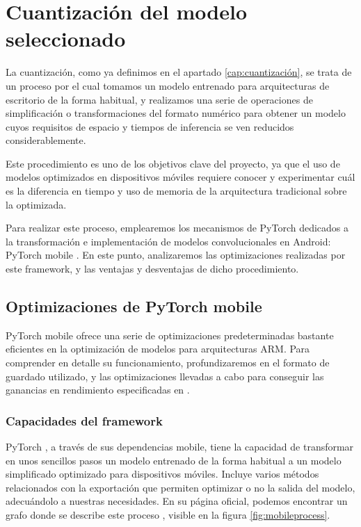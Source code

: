 \chapter{Cuantización del modelo seleccionado}
\label{sec:capt6}

La cuantización, como ya definimos en el apartado \ref{cap:cuantización}, se trata de un proceso por el cual tomamos un modelo entrenado para arquitecturas de escritorio de la forma habitual, y realizamos una serie de operaciones de simplificación o transformaciones del formato numérico para obtener un modelo cuyos requisitos de espacio y tiempos de inferencia se ven reducidos considerablemente. 

Este procedimiento es uno de los objetivos clave del proyecto, ya que el uso de modelos optimizados en dispositivos móviles requiere conocer y experimentar cuál es la diferencia en tiempo y uso de memoria de la arquitectura tradicional sobre la optimizada.

Para realizar este proceso, emplearemos los mecanismos de PyTorch\cite{paszke2019pytorch} dedicados a la transformación e implementación de modelos convolucionales en Android: PyTorch mobile  \cite{pmobile}. En este punto, analizaremos las optimizaciones realizadas por este framework, y las ventajas y desventajas de dicho procedimiento.

\section{Optimizaciones de PyTorch mobile}

PyTorch mobile ofrece una serie de optimizaciones predeterminadas bastante eficientes en la optimización de modelos para arquitecturas ARM. Para comprender en detalle su funcionamiento, profundizaremos en el formato de guardado utilizado, y las optimizaciones llevadas a cabo para conseguir las ganancias en rendimiento especificadas en \cite{pmobile}.

\subsection{Capacidades del framework}
PyTorch \cite{paszke2019pytorch}, a través de sus dependencias mobile, tiene la capacidad de transformar en unos sencillos pasos un modelo entrenado de la forma habitual a un modelo simplificado optimizado para dispositivos móviles. Incluye varios métodos relacionados con la exportación que permiten optimizar o no la salida del modelo, adecuándolo a nuestras necesidades. En su página oficial, podemos encontrar un grafo donde se describe este proceso \cite{pmobile}, visible en la figura \ref{fig:mobileprocess}.

